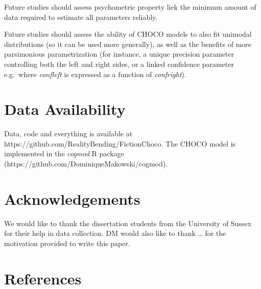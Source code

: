 \documentclass[
  jou,
  floatsintext,
  longtable,
  nolmodern,
  notxfonts,
  notimes,
  colorlinks=true,linkcolor=blue,citecolor=blue,urlcolor=blue]{apa7}
\begin{document}
Future studies should assess psychometric property liek the minimum
amount of data required to estimate all parameters reliably.

Future studies should assess the ability of CHOCO models to also fit
unimodal distributions (so it can be used more generally), as well as
the benefits of more parsimonious parametrization (for instance, a
unique precision parameter controlling both the left and right sides, or
a linked confidence parameter e.g.~where \emph{confleft} is expressed as
a function of \emph{confright}).

\section{Data Availability}\label{data-availability}

Data, code and everything is available at
https://github.com/RealityBending/FictionChoco. The CHOCO model is
implemented in the \emph{cogmod} R package
(https://github.com/DominiqueMakowski/cogmod).

\section{Acknowledgements}\label{acknowledgements}

We would like to thank the dissertation students from the University of
Sussex for their help in data collection. DM would also like to thank
\ldots{} for the motivation provided to write this paper.

\section{References}\label{references}
\end{document}
